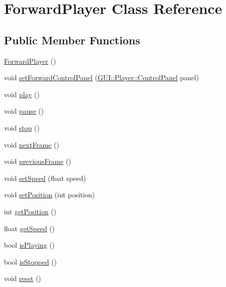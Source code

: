 \hypertarget{classGUI_1_1ForwardPlayer}{}\section{Forward\+Player Class Reference}
\label{classGUI_1_1ForwardPlayer}
\subsection*{Public Member Functions}
\begin{DoxyCompactItemize}
\item 
\hyperlink{classGUI_1_1ForwardPlayer_a61bebb272dd2685ca2bfdf72349bc0f1}{Forward\+Player} ()
\item 
void \hyperlink{classGUI_1_1ForwardPlayer_a197c17c5b8dc04f8c311b41763a9db0e}{set\+Forward\+Control\+Panel} (\hyperlink{classGUI_1_1Player_1_1ControlPanel}{G\+U\+I\+::\+Player\+::\+Control\+Panel} panel)
\item 
void \hyperlink{classGUI_1_1ForwardPlayer_a6d58098c6cf63c241ed03bc797256bb1}{play} ()
\item 
void \hyperlink{classGUI_1_1ForwardPlayer_a7167f5c196fc5e167bfabde1a730e81d}{pause} ()
\item 
void \hyperlink{classGUI_1_1ForwardPlayer_a8c528baf37154d347366083f0f816846}{stop} ()
\item 
void \hyperlink{classGUI_1_1ForwardPlayer_a365329da56f8b07f8c95027ba967bbc3}{next\+Frame} ()
\item 
void \hyperlink{classGUI_1_1ForwardPlayer_a3c96ed37c70ebc0b32c527a04e1536d1}{previous\+Frame} ()
\item 
void \hyperlink{classGUI_1_1ForwardPlayer_a5466c67c5ec22359c0702dc4ac8ffb19}{set\+Speed} (float speed)
\item 
void \hyperlink{classGUI_1_1ForwardPlayer_a1aa68f77243229daea38d59bc5145d35}{set\+Position} (int position)
\item 
int \hyperlink{classGUI_1_1ForwardPlayer_a97825791568ee242ca19d25b75030d87}{get\+Position} ()
\item 
float \hyperlink{classGUI_1_1ForwardPlayer_a26ebefde7fe71954e6c1282255951b7d}{get\+Speed} ()
\item 
bool \hyperlink{classGUI_1_1ForwardPlayer_a8438e3403946accc1986a05b89ee7b03}{is\+Playing} ()
\item 
bool \hyperlink{classGUI_1_1ForwardPlayer_a2fc5ff4f369aaa46c55c3ad3c63216d6}{is\+Stopped} ()
\item 
void \hyperlink{classGUI_1_1ForwardPlayer_ad20897c5c8bd47f5d4005989bead0e55}{reset} ()
\end{DoxyCompactItemize}
